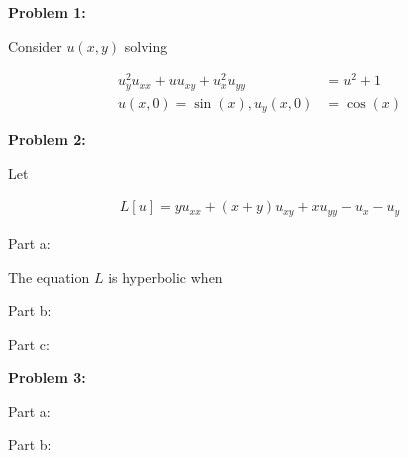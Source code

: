 \documentclass[a4paper,12pt]{article}
\begin{document}
{\bf Problem 1:}

Consider $u(x,y)$ solving

\begin{align*}
u_y^2u_{xx}+uu_{xy}+u_x^2u_{yy} &= u^2+1\\
u(x,0) = \sin(x), u_y(x,0) &= \cos(x)
\end{align*}

\shunt

{\bf Problem 2:}

Let

\begin{align*}
L[u] = yu_{xx} + (x+y)u_{xy} + xu_{yy} - u_x - u_y
\end{align*}

Part a:

The equation $L$ is hyperbolic when 

\shunt

Part b:

\shunt

Part c:

\shunt

{\bf Problem 3:}

Part a:

\shunt

Part b:

\shunt
\end{document}
